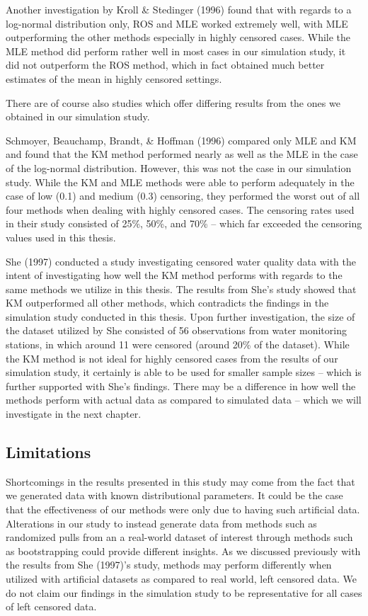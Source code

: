 \documentclass[12pt, twoside]{amherstthesis}
\begin{document}
Another investigation by Kroll \& Stedinger (1996) found that with regards to a log-normal distribution only, ROS and MLE worked extremely well, with MLE outperforming the other methods especially in highly censored cases. While the MLE method did perform rather well in most cases in our simulation study, it did not outperform the ROS method, which in fact obtained much better estimates of the mean in highly censored settings.

There are of course also studies which offer differing results from the ones we obtained in our simulation study.

Schmoyer, Beauchamp, Brandt, \& Hoffman (1996) compared only MLE and KM and found that the KM method performed nearly as well as the MLE in the case of the log-normal distribution. However, this was not the case in our simulation study. While the KM and MLE methods were able to perform adequately in the case of low (0.1) and medium (0.3) censoring, they performed the worst out of all four methods when dealing with highly censored cases. The censoring rates used in their study consisted of 25\%, 50\%, and 70\% -- which far exceeded the censoring values used in this thesis.

She (1997) conducted a study investigating censored water quality data with the intent of investigating how well the KM method performs with regards to the same methods we utilize in this thesis. The results from She's study showed that KM outperformed all other methods, which contradicts the findings in the simulation study conducted in this thesis. Upon further investigation, the size of the dataset utilized by She consisted of 56 observations from water monitoring stations, in which around 11 were censored (around 20\% of the dataset). While the KM method is not ideal for highly censored cases from the results of our simulation study, it certainly is able to be used for smaller sample sizes -- which is further supported with She's findings. There may be a difference in how well the methods perform with actual data as compared to simulated data -- which we will investigate in the next chapter.

\hypertarget{limitations}{%
\subsection{Limitations}\label{limitations}}

Shortcomings in the results presented in this study may come from the fact that we generated data with known distributional parameters. It could be the case that the effectiveness of our methods were only due to having such artificial data. Alterations in our study to instead generate data from methods such as randomized pulls from an a real-world dataset of interest through methods such as bootstrapping could provide different insights. As we discussed previously with the results from She (1997)'s study, methods may perform differently when utilized with artificial datasets as compared to real world, left censored data. We do not claim our findings in the simulation study to be representative for all cases of left censored data.
\end{document}
